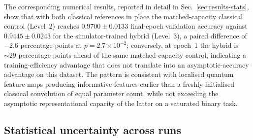The corresponding numerical results, reported in detail in Sec.~\ref{sec:results-stats}, show that with both classical references in place the matched-capacity classical control (Level~2) reaches $0.9700\pm 0.0133$ final-epoch validation accuracy against $0.9445\pm 0.0243$ for the simulator-trained hybrid (Level~3), a paired difference of $-2.6$ percentage points at $p=2.7\times 10^{-2}$; conversely, at epoch~$1$ the hybrid is $\sim 29$ percentage points ahead of the same matched-capacity control, indicating a training-efficiency advantage that does not translate into an asymptotic-accuracy advantage on this dataset. The pattern is consistent with localised quantum feature maps producing informative features earlier than a freshly initialised classical convolution of equal parameter count, while not exceeding the asymptotic representational capacity of the latter on a saturated binary task.

\subsection{Statistical uncertainty across runs}
\label{sec:stats-significance}

